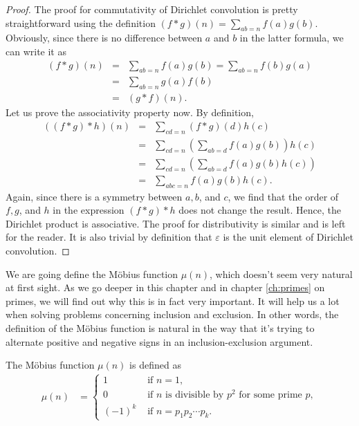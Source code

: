 \documentclass[12pt]{subfile}
\begin{document}
		\begin{proof}
			The proof for commutativity of Dirichlet convolution is pretty straightforward using the definition $(f\ast g)(n)=\displaystyle\sum_{ab=n}f(a)g(b)$. Obviously, since there is no difference between $a$ and $b$ in the latter formula, we can write it as
				\begin{eqnarray*}
					(f\ast g)(n) &=& \sum_{ab=n}f(a)g(b)= \sum_{ab=n}f(b)g(a)\\
								 &=& \sum_{ab=n}g(a)f(b)\\
								 &=& (g\ast f)(n).
				\end{eqnarray*}
			Let us prove the associativity property now. By definition,
				\begin{eqnarray*}
					((f \ast g) \ast h)(n) &=& \sum_{cd=n} (f\ast g)(d) h(c)\\
										   &=& \sum_{cd=n} \left(\sum_{ab=d} f(a)g(b)\right) h(c)\\
										   &=& \sum_{cd=n} \left(\sum_{ab=d} f(a)g(b) h(c)\right)\\
										   &=& \sum_{abc=n} f(a)g(b) h(c).
				\end{eqnarray*}
			Again, since there is a symmetry between $a,b$, and $c$, we find that the order of $f,g$, and $h$ in the expression $(f \ast g) \ast h$ does not change the result. Hence, the Dirichlet product is associative.
			The proof for distributivity is similar and is left for the reader. It is also trivial by definition that $\varepsilon$ is the unit element of Dirichlet convolution.
		\end{proof}


		We are going define the M\"{o}bius function $\mu(n)$, which doesn't seem very natural at first sight. As we go deeper in this chapter and in chapter \ref{ch:primes} on primes, we will find out why this is in fact very important. It will help us a lot when solving problems concerning inclusion and exclusion. In other words, the definition of the M\"{o}bius function is natural in the way that it's trying to alternate positive and negative signs in an inclusion-exclusion argument.

		\begin{definition}\label{def:mobius}
			The M\"{o}bius function $\mu(n)$ is defined as
				\begin{align*}
					\mu(n) & =
						\begin{cases}
						1&\mbox{ if }n=1,\\
						0&\mbox{ if }n
						\mbox{ is divisible by }p^2
						\mbox{ for some prime }p,\\
						(-1)^k&\mbox{ if }n=p_1p_2\cdots p_k.
						\end{cases}
				\end{align*}
		\end{definition}
\end{document}
